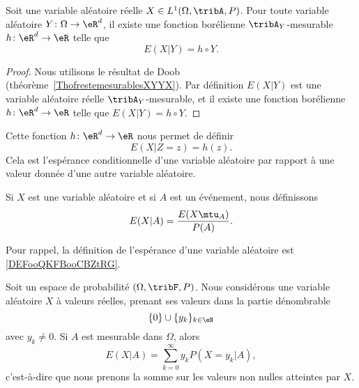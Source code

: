 \begin{proposition}
	Soit une variable aléatoire réelle \( X\in L^1(\Omega,\tribA,P)\). Pour toute variable aléatoire \( Y\colon \Omega\to \eR^d\), il existe une fonction borélienne \( \tribA_Y\)-mesurable \( h\colon \eR^d\to \eR\) telle que
	\begin{equation}
		E(X|Y)=h\circ Y.
	\end{equation}
\end{proposition}

\begin{proof}
	Nous utilisons le résultat de Doob (théorème~\ref{ThofrestemesurablesXYYX}). Par définition \( E(X|Y)\) est une variable aléatoire réelle \( \tribA_Y\)-mesurable, et il existe une fonction borélienne \( h\colon \eR^d\to \eR\) telle que \( E(X|Y)=h\circ Y\).
\end{proof}

Cette fonction \( h\colon \eR^d\to \eR\) nous permet de définir
\begin{equation}
	E(X|Z=z)=h(z).
\end{equation}
Cela est l'espérance conditionnelle d'une variable aléatoire par rapport à une valeur donnée d'une autre variable aléatoire.

\begin{definition}     \label{DEFooOMLCooJgrbpx}
	Si \( X\) est une variable aléatoire et si \( A\) est un événement, nous définissons
	\begin{equation}
		E(X|A)=\frac{ E(X\mtu_A) }{ P(A) }.
	\end{equation}
\end{definition}
Pour rappel, la définition de l'espérance d'une variable aléatoire est \ref{DEFooQKFBooCBZtRG}.

\begin{lemma}    \label{LEMooRTVBooCEeIxL}
	Soit un espace de probabilité \( (\Omega,\tribF,P)\). Nous considérons une variable aléatoire \( X\) à valeurs réelles, prenant ses valeurs dans la partie dénombrable
	\begin{equation}
		\{ 0 \}\cup \{ y_k \}_{k\in \eN}
	\end{equation}
	avec \( y_k\neq 0\).  Si \( A\) est mesurable dans \( \Omega\), alors
	\begin{equation}
		E(X|A)=\sum_{k=0}^{\infty}y_kP(X=y_k|A),
	\end{equation}
	c'est-à-dire que nous prenons la somme sur les valeurs non nulles atteintes par \( X\).
\end{lemma}

